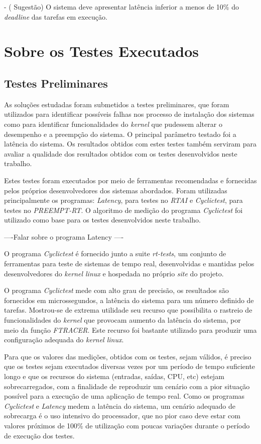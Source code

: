 - ( Sugestão) O sistema deve apresentar latência inferior a menos de 10\% do \textit{deadline} das tarefas em execução.

\section{Sobre os Testes Executados}

\subsection{Testes Preliminares}

As soluções estudadas foram submetidos a testes preliminares, que foram utilizados para identificar possíveis falhas nos processo de instalação dos sistemas como para identificar funcionalidades do \textit{kernel} que pudessem alterar o desempenho e a preempção do sistema. O principal parâmetro testado foi a latência do sistema. Os resultados obtidos com estes testes também serviram para avaliar a qualidade dos resultados obtidos com os testes desenvolvidos neste trabalho.

Estes testes foram executados por meio de ferramentas recomendadas e fornecidas pelos próprios desenvolvedores dos sistemas abordados. Foram utilizadas principalmente os programas: \textit{Latency}, para testes no \textit{RTAI} e \textit{Cyclictest}, para testes no \textit{PREEMPT-RT}. O algoritmo de medição do programa \textit{Cyclictest} foi utilizado como base para os testes desenvolvidos neste trabalho.

----Falar sobre o programa Latency ----

O programa \textit{Cyclictest} \cite{FreeSoftware} é fornecido junto a suite \textit{rt-tests}, um conjunto de ferramentas para teste de sistemas de tempo real, desenvolvidas e mantidas pelos desenvolvedores do \textit{kernel linux} e hospedada no próprio \textit{site} do projeto.

O programa \textit{Cyclictest} mede com alto grau de precisão, os resultados são fornecidos em microssegundos, a latência do sistema para um número definido de tarefas. Mostrou-se de extrema utilidade seu recurso que possibilita o rastreio de funcionalidades do \textit{kernel} que provocam aumento da latência do sistema, por meio da função \textit{FTRACER}. Este recurso foi bastante utilizado para produzir uma configuração adequada do \textit{kernel linux}.

Para que os valores das medições, obtidos com os testes, sejam válidos, é preciso que os testes sejam executados diversas vezes por um período de tempo suficiente longo e que os recursos do sistema (entradas, saídas, CPU, etc) estejam sobrecarregados, com a finalidade de reproduzir um cenário com a pior situação possível para a execução de uma aplicação de tempo real. Como os programas \textit{Cyclictest} e \textit{Latency} medem a latência do sistema, um cenário adequado de sobrecarga é o uso intensivo do processador, que no pior caso deve estar com valores próximos de 100\% de utilização  com poucas variações durante o período de execução dos testes.

